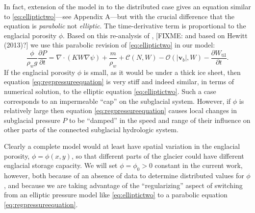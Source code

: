 \documentclass[11pt,final]{amsart}
\newcommand\bv{\mathbf{v}}
\newcommand{\ddt}[1]{\ensuremath{\frac{\partial #1}{\partial t}}}
\newcommand{\Div}{\nabla\cdot}
\newcommand{\grad}{\nabla}
\newcommand{\Wtil}{W_{\text{til}}}
\begin{document}
In fact, extension of the model in \cite{Bartholomausetal2011} to the distributed case gives an equation similar to \eqref{eq:elliptictwo}---see Appendix A---but with the crucial difference that the equation is \emph{parabolic} not \emph{elliptic}.  The time-derivative term is proportional to the englacial porosity $\phi$.  Based on this re-analysis of \cite{Bartholomausetal2011}, [FIXME: and based on Hewitt (2013)?] we use this parabolic revision of \eqref{eq:elliptictwo} in our model:
\begin{equation}
\frac{\phi}{\rho_w g} \ddt{P} = \Div\left(K W \grad \psi\right) + \frac{m}{\rho_w} + \mathcal{C}(N,W) - \mathcal{O}(|\bv_b|,W) - \ddt{\Wtil}. \label{eq:regpressureequation}
\end{equation}
If the englacial porosity $\phi$ is small, as it would be under a thick ice sheet, then equation \eqref{eq:regpressureequation} is very stiff and indeed similar, in terms of numerical solution, to the elliptic equation \eqref{eq:elliptictwo}.  Such a case corresponds to an impermeable ``cap'' on the subglacial system.  However, if $\phi$ is relatively large then equation \eqref{eq:regpressureequation} causes local changes in subglacial pressure $P$ to be ``damped'' in the speed and range of their influence on other parts of the connected subglacial hydrologic system.

Clearly a complete model would at least have spatial variation in the englacial porosity, $\phi=\phi(x,y)$, so that different parts of the glacier could have different englacial storage capacity.  We will set $\phi=\phi_0>0$ constant in the current work, however, both because of an absence of data to determine distributed values for $\phi$, and because we are taking advantage of the ``regularizing'' aspect of switching from an elliptic pressure model like \eqref{eq:elliptictwo} to a parabolic equation \eqref{eq:regpressureequation}.
\end{document}
